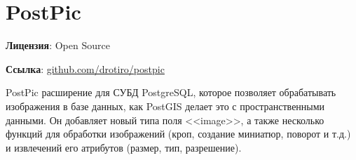 \section{PostPic}
\textbf{Лицензия}: Open Source

\textbf{Ссылка}: \href{http://github.com/drotiro/postpic}{github.com/drotiro/postpic}

PostPic расширение для СУБД PostgreSQL, которое позволяет обрабатывать изображения в базе данных, как PostGIS делает это с пространственными данными.
Он добавляет новый типа поля <<image>>, а также несколько функций для обработки изображений (кроп, создание миниатюр, поворот и т.д.) и 
извлечений его атрибутов (размер, тип, разрешение).